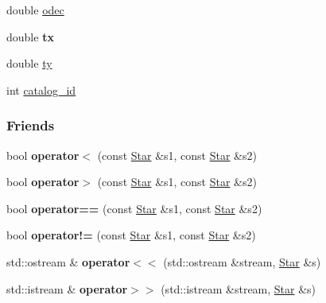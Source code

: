 \begin{DoxyCompactItemize}
\item 
\hypertarget{classStar_a828e0dbc581cd5f9cce51c034d068cf3}{
double \hyperlink{classStar_a828e0dbc581cd5f9cce51c034d068cf3}{odec}}
\label{classStar_a828e0dbc581cd5f9cce51c034d068cf3}

\item 
\hypertarget{classStar_a26184b4582a308b6eb7072b6068b60f1}{
double {\bfseries tx}}
\label{classStar_a26184b4582a308b6eb7072b6068b60f1}

\item 
\hypertarget{classStar_a5e1dedf4e3dc836ef991ce1fb4989041}{
double \hyperlink{classStar_a5e1dedf4e3dc836ef991ce1fb4989041}{ty}}
\label{classStar_a5e1dedf4e3dc836ef991ce1fb4989041}

\item 
\hypertarget{classStar_a2bbf34d3244a49d09bdca8ef13c475d8}{
int \hyperlink{classStar_a2bbf34d3244a49d09bdca8ef13c475d8}{catalog\_\-id}}
\label{classStar_a2bbf34d3244a49d09bdca8ef13c475d8}

\end{DoxyCompactItemize}
\subsubsection*{Friends}
\begin{DoxyCompactItemize}
\item 
\hypertarget{classStar_a5f7c099a163e649e9e998c4542622e1e}{
bool {\bfseries operator$<$} (const \hyperlink{classStar}{Star} \&s1, const \hyperlink{classStar}{Star} \&s2)}
\label{classStar_a5f7c099a163e649e9e998c4542622e1e}

\item 
\hypertarget{classStar_af184317c033dec29617a61c59d402f74}{
bool {\bfseries operator$>$} (const \hyperlink{classStar}{Star} \&s1, const \hyperlink{classStar}{Star} \&s2)}
\label{classStar_af184317c033dec29617a61c59d402f74}

\item 
\hypertarget{classStar_a4c897677c011613260249bd26df7b92f}{
bool {\bfseries operator==} (const \hyperlink{classStar}{Star} \&s1, const \hyperlink{classStar}{Star} \&s2)}
\label{classStar_a4c897677c011613260249bd26df7b92f}

\item 
\hypertarget{classStar_acbbd2067f482caccf398284c650c8546}{
bool {\bfseries operator!=} (const \hyperlink{classStar}{Star} \&s1, const \hyperlink{classStar}{Star} \&s2)}
\label{classStar_acbbd2067f482caccf398284c650c8546}

\item 
\hypertarget{classStar_a34d4a34b441566bae46900ccef8d47d5}{
std::ostream \& {\bfseries operator$<$$<$} (std::ostream \&stream, \hyperlink{classStar}{Star} \&s)}
\label{classStar_a34d4a34b441566bae46900ccef8d47d5}

\item 
\hypertarget{classStar_a2e4c669c771d70c3b0318e4c19d0e4a3}{
std::istream \& {\bfseries operator$>$$>$} (std::istream \&stream, \hyperlink{classStar}{Star} \&s)}
\label{classStar_a2e4c669c771d70c3b0318e4c19d0e4a3}

\end{DoxyCompactItemize}


